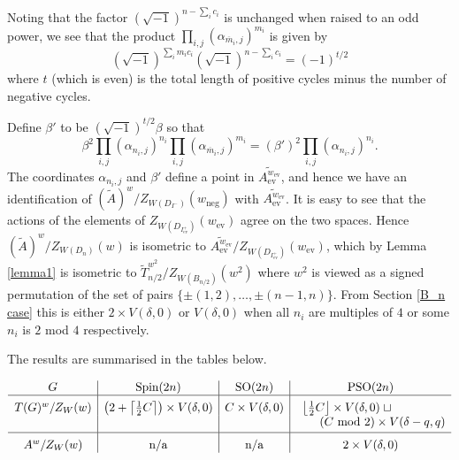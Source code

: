 \documentclass[11pt,a4paper]{article}
\def\Spin{\mathrm{Spin}}
\def\SO{\mathrm{SO}}
\def\PSO{\mathrm{PSO}}
\def\Atilde{(\widetilde{A})}
\def\mbar{\overline{m}}
\def\mbar{\overline{m}}
\def\coveringtorus{\tilde{T}}
\def\ev{\mathrm{ev}}
\def\TSpinn{\coveringtorus_{n/2}}
\def\neg{\mathrm{neg}}
\begin{document}
Noting that the factor $(\sqrt{-1})^{n-\sum_i c_i}$ is unchanged when raised to an odd power, we see that the product $\prod_{i,j}(\alpha_{\mbar_i,j})^{m_i}$ is given by
\[
(\sqrt{-1})^{\sum_i m_ic_i}(\sqrt{-1})^{n-\sum_i c_i}=(-1)^{t/2}
\]
where $t$ (which is even) is the total length of positive cycles minus the number of negative cycles.

Define $\beta'$ to be $(\sqrt{-1})^{t/2}\beta$ so that
\[
\beta^2\prod_{i,j}(\alpha_{n_i,j})^{n_i}\prod_{i,j}(\alpha_{\mbar_i,j})^{m_i}=(\beta')^2\prod_{i,j}(\alpha_{n_i,j})^{n_i}.
\]
The coordinates $\alpha_{n_i,j}$ and $\beta'$ define a point in $\widetilde{A_\ev^{w_\ev}}$, and hence we have an identification of $\Atilde^w/Z_{W(D_{I^-})}(w_\neg)$ with $\widetilde{A_\ev^{w_\ev}}$. It is easy to see that the actions of the elements of $Z_{W(D_{I^+_\ev})}(w_\ev)$ agree on the two spaces.  Hence $\Atilde^w/Z_{W(D_n)}(w)$ is isometric to $\widetilde{A_\ev^{w_\ev}}/Z_{W(D_{I^+_\ev})}(w_\ev)$, which by Lemma \ref{lemma1} is isometric to $\TSpinn^{w^2}/Z_{W(B_{n/2})}(w^2)$ where $w^2$ is viewed as a signed permutation of the set of pairs $\{\pm(1,2),\dots,\pm(n-1,n)\}$.  From Section \ref{B_n case} this is either $2\times V(\delta,0)$ or $V(\delta,0)$ when all $n_i$ are multiples of $4$ or some $n_i$ is $2$ mod $4$ respectively.





The results are summarised in the tables below.

\bigskip

\begin{table}[h]
\[
\begin{array}{c|c|c|c}
G & \Spin(2n)   &
 \SO(2n)   & 
\PSO(2n)    \\
 \hline
{}^{\strut} T(G)^w/Z_W(w)& \left( 2 +\left\lceil \frac 12 C\right\rceil\right) \times V(\delta,0) &  C\times V(\delta,0)  &\left\lfloor \frac 12 C\right\rfloor \times V(\delta,0) \;\sqcup\qquad\qquad\\
&&&\qquad(C\text{ mod } 2)\times V(\delta-q,q)\\[.5ex]
\hline
{}^{\strut} A^w/Z_W(w) &\text{n/a} &\text{n/a}
& 2\times V(\delta,0)
\end{array}
\]

\bigskip

    \caption{The structure of the sector in the classical cases for a conjugacy class with negative cycles but no odd positive cycles}

\end{table}
\end{document}
